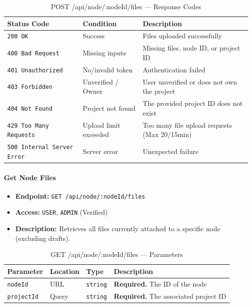 \begin{table}[H]
\centering
\renewcommand{\arraystretch}{1.3}
\begin{tabularx}{\textwidth}{|l|l|X|}
\hline
\textbf{Status Code} & \textbf{Condition} & \textbf{Description} \\
\hline
\texttt{200 OK}           & Success             & Files uploaded successfully \\
\hline
\texttt{400 Bad Request}  & Missing inputs       & Missing files, node ID, or project ID \\
\hline
\texttt{401 Unauthorized} & No/invalid token     & Authentication failed \\
\hline
\texttt{403 Forbidden}    & Unverified / Owner   & User unverified or does not own the project \\
\hline
\texttt{404 Not Found}    & Project not found    & The provided project ID does not exist \\
\hline
\texttt{429 Too Many Requests} & Upload limit exceeded & Too many file upload requests (Max 20/15min) \\
\hline
\texttt{500 Internal Server Error} & Server error & Unexpected failure \\
\hline
\end{tabularx}
\caption{POST /api/node/:nodeId/files — Response Codes}
\label{tab:upload-node-files-responses}
\end{table}
\FloatBarrier

\paragraph{Get Node Files}
\label{subsubsec:get-node-files}

\begin{itemize}
  \item \textbf{Endpoint:} \texttt{GET /api/node/:nodeId/files}
  \item \textbf{Access:} \texttt{USER}, \texttt{ADMIN} (Verified)
  \item \textbf{Description:} Retrieves all files currently attached to a specific node (excluding drafts).
\end{itemize}

\begin{table}[H]
\centering
\renewcommand{\arraystretch}{1.3}
\begin{tabularx}{\textwidth}{|l|l|l|X|}
\hline
\textbf{Parameter} & \textbf{Location} & \textbf{Type} & \textbf{Description} \\
\hline
\texttt{nodeId}    & URL   & \texttt{string}  & \textbf{Required.} The ID of the node \\
\hline
\texttt{projectId} & Query & \texttt{string}  & \textbf{Required.} The associated project ID \\
\hline
\end{tabularx}
\caption{GET /api/node/:nodeId/files — Parameters}
\label{tab:get-node-files-params}
\end{table}

